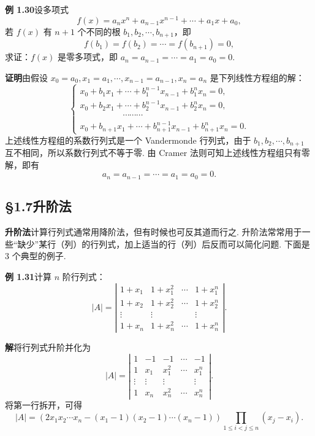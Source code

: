 \documentclass[UTF8,12pt,a4paper,fontset=fandol]{ctexart}
\begin{document}
\noindent\textbf{例 1.30}\quad 设多项式
\[
f(x)=a_nx^n+a_{n-1}x^{n-1}+\cdots+a_1x+a_0,
\]
若 $f(x)$ 有 $n+1$ 个不同的根 $b_1,b_2,\cdots,b_{n+1}$，即
\[
f(b_1)=f(b_2)=\cdots=f(b_{n+1})=0,
\]
求证：$f(x)$ 是零多项式，即 $a_n=a_{n-1}=\cdots=a_1=a_0=0$.

\noindent\textbf{证明}\quad 由假设 $x_0=a_0,x_1=a_1,\cdots,x_{n-1}=a_{n-1},x_n=a_n$ 是下列线性方程组的解：
\[
\left\{\begin{array}{l}
x_0+b_1x_1+\cdots+b_1^{n-1}x_{n-1}+b_1^nx_n=0,\\
x_0+b_2x_1+\cdots+b_2^{n-1}x_{n-1}+b_2^nx_n=0,\\
\hspace{5em}\cdots\cdots\cdots\\
x_0+b_{n+1}x_1+\cdots+b_{n+1}^{n-1}x_{n-1}+b_{n+1}^nx_n=0.
\end{array}\right.
\]
上述线性方程组的系数行列式是一个 Vandermonde 行列式，由于 $b_1,b_2,\cdots,b_{n+1}$ 互不相同，所以系数行列式不等于零. 由 Cramer 法则可知上述线性方程组只有零解，即有
\[
a_n=a_{n-1}=\cdots=a_1=a_0=0.
\]

\subsection*{§1.7\quad 升阶法}

\noindent\textbf{升阶法}\quad 计算行列式通常用降阶法，但有时候也可反其道而行之. 升阶法常常用于一些“缺少”某行（列）的行列式，加上适当的行（列）后反而可以简化问题. 下面是 3 个典型的例子.

\noindent\textbf{例 1.31}\quad 计算 $n$ 阶行列式：
\[
|A|=\left|\begin{array}{cccc}
1+x_1 & 1+x_1^2 & \cdots & 1+x_1^n\\
1+x_2 & 1+x_2^2 & \cdots & 1+x_2^n\\
\vdots & \vdots &        & \vdots\\
1+x_n & 1+x_n^2 & \cdots & 1+x_n^n
\end{array}\right|.
\]

\noindent\textbf{解}\quad 将行列式升阶并化为
\[
|A|=
\left|\begin{array}{ccccc}
1 & -1 & -1 & \cdots & -1\\
1 & x_1 & x_1^2 & \cdots & x_1^n\\
\vdots & \vdots & \vdots &        & \vdots\\
1 & x_n & x_n^2 & \cdots & x_n^n
\end{array}\right|.
\]
将第一行拆开，可得
\[
|A|=\left(2x_1x_2\cdots x_n-(x_1-1)(x_2-1)\cdots(x_n-1)\right)
\prod_{1\le i<j\le n}(x_j-x_i).
\]
\end{document}
